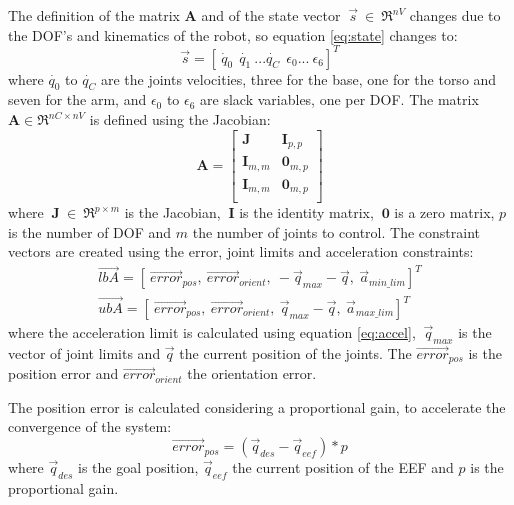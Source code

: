 The definition of the matrix \textbf{A} and of the state vector $\ \vec{s}\ \in\ \Re^{nV}$ changes due to the DOF's and kinematics of the robot, so equation \ref{eq:state} changes to:
\begin{equation}
\vec{s} = [\dot{\ q_{0}} \ \ \dot{q_{1}} \ ... \dot{q_{C}} \ \ \epsilon_{0} ... \ \epsilon_{6} ]^{T}
\end{equation}
where $\dot{q_{0}}$ to $\dot{q_{C}}$ are the joints velocities, three for the base, one for the torso and seven for the arm, and $\epsilon_{0}$ to $\epsilon_{6}$ are slack variables, one per DOF. The matrix $\textbf{A} \in \Re^{nC\times nV}$ is defined using the Jacobian:
\begin{equation}
\textbf{A} =
\left[ \begin{array}{cc}
\textbf{J} & \textbf{I}_{p,p} \\
\textbf{I}_{m,m} & \textbf{0}_{m,p} \\
\textbf{I}_{m,m} & \textbf{0}_{m,p} \\
\end{array}
\right]
\end{equation}
where $\ \textbf{J}\ \in\ \Re^{p\times m}$ is the Jacobian, $\ \textbf{I}$ is the identity matrix, $\ \textbf{0}$ is a zero matrix, $p$ is the number of DOF and $m$ the number of joints to control. The constraint vectors are created using the error, joint limits and acceleration constraints:
\begin{subequations}
	\begin{align}
		\vec{lbA} = [\ \vec{error}_{pos},\ \vec{error}_{orient},\ -\vec{q}_{max} - 	\vec{q},\ \vec{a}_{min\_lim} ]^{T}\\
		\vec{ubA} = [\ \vec{error}_{pos},\ \vec{error}_{orient},\ \vec{q}_{max} - \vec{q},\ \vec{a}_{max\_lim} ]^{T}
	\end{align}
	\label{eq:const_vectors}
\end{subequations}
where the acceleration limit is calculated using equation \ref{eq:accel}, $\ \vec{q}_{max}$ is the vector of joint limits and $\vec{q}$ the current position of the joints. The $\vec{error}_{pos}$ is the position error and $\vec{error}_{orient}$ the orientation error. 

The position error is calculated  considering a proportional gain, to accelerate the convergence of the system:
$$\vec{error}_{pos} = (\vec{q}_{des} - \vec{q}_{eef})*p $$
where $\vec{q}_{des}$ is the goal position, $\vec{q}_{eef}$ the current position of the EEF and $p$ is the proportional gain. 

